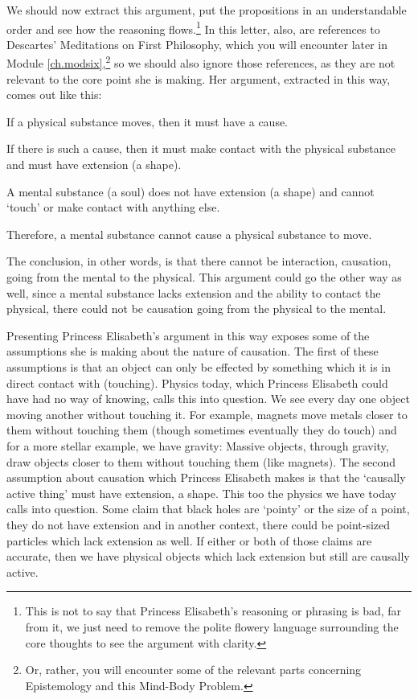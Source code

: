 We should now extract this argument, put the propositions in an understandable order and see how the reasoning flows.\footnote{This is not to say that Princess Elisabeth's reasoning or phrasing is bad, far from it, we just need to remove the polite flowery language surrounding the core thoughts to see the argument with clarity.} In this letter, also, are references to Descartes' Meditations on First Philosophy, which you will encounter later in Module \ref{ch.modsix},\footnote{Or, rather, you will encounter some of the relevant parts concerning Epistemology and this Mind-Body Problem.} so we should also ignore those references, as they are not relevant to the core point she is making. Her argument, extracted in this way, comes out like this:

\begin{earg}
     \item[1 ] If a physical substance moves, then it must have a cause.
     \item[2 ] If there is such a cause, then it must make contact with the physical substance and must have extension (a shape).
     \item[3 ] A mental substance (a soul) does not have extension (a shape) and cannot `touch' or make contact with anything else.
     \item[4 ] Therefore, a mental substance cannot cause a physical substance to move.
\end{earg}

The conclusion, in other words, is that there cannot be interaction, causation, going from the mental to the physical. This argument could go the other way as well, since a mental substance lacks extension and the ability to contact the physical, there could not be causation going from the physical to the mental. 

Presenting Princess Elisabeth's argument in this way exposes some of the assumptions she is making about the nature of causation. The first of these assumptions is that an object can only be effected by something which it is in direct contact with (touching). Physics today, which Princess Elisabeth could have had no way of knowing, calls this into question. We see every day one object moving another without touching it. For example, magnets move metals closer to them without touching them (though sometimes eventually they do touch) and for a more stellar example, we have gravity: Massive objects, through gravity, draw objects closer to them without touching them (like magnets). The second assumption about causation which Princess Elisabeth makes is that the `causally active thing' must have extension, a shape. This too the physics we have today calls into question. Some claim that black holes are `pointy' or the size of a point, they do not have extension and in another context, there could be point-sized particles which lack extension as well. If either or both of those claims are accurate, then we have physical objects which lack extension but still are causally active. 

